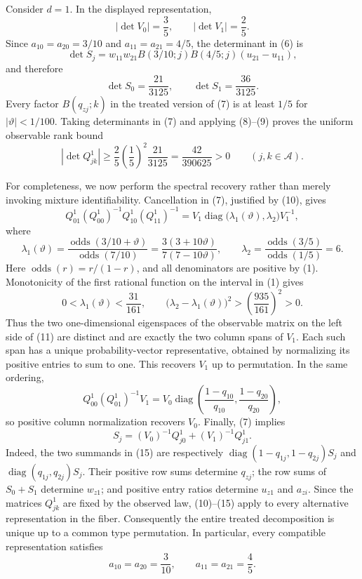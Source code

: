 Consider \(d=1\).  In the displayed representation,
\[
 |\det V_0|=\frac35,
 \qquad |\det V_1|=\frac25.
 \tag{8}
\]
Since \(a_{10}=a_{20}=3/10\) and \(a_{11}=a_{21}=4/5\), the determinant in (6) is
\[
 \det S_j=w_{11}w_{21}B(3/10;j)B(4/5;j)(u_{21}-u_{11}),
\]
and therefore
\[
 \det S_0=\frac{21}{3125},
 \qquad \det S_1=\frac{36}{3125}.
 \tag{9}
\]
Every factor \(B(q_{zj};k)\) in the treated version of (7) is at least \(1/5\) for \(|\vartheta|<1/100\).  Taking determinants in (7) and applying (8)--(9) proves the uniform observable rank bound
\[
 |\det Q_{jk}^{1}|
 \ge \frac25\left(\frac15\right)^2\frac{21}{3125}
 =\frac{42}{390625}>0
 \qquad(j,k\in\mathcal A).
 \tag{10}
\]

For completeness, we now perform the spectral recovery rather than merely invoking mixture identifiability.  Cancellation in (7), justified by (10), gives
\[
 Q_{01}^{1}(Q_{00}^{1})^{-1}Q_{10}^{1}(Q_{11}^{1})^{-1}
 =V_1\operatorname{diag}\bigl(\lambda_1(\vartheta),\lambda_2\bigr)V_1^{-1},
 \tag{11}
\]
where
\[
 \lambda_1(\vartheta)
 =\frac{\operatorname{odds}(3/10+\vartheta)}{\operatorname{odds}(7/10)}
 =\frac{3(3+10\vartheta)}{7(7-10\vartheta)},
 \qquad
 \lambda_2
 =\frac{\operatorname{odds}(3/5)}{\operatorname{odds}(1/5)}=6.
 \tag{12}
\]
Here \(\operatorname{odds}(r)=r/(1-r)\), and all denominators are positive by (1).  Monotonicity of the first rational function on the interval in (1) gives
\[
 0<\lambda_1(\vartheta)<\frac{31}{161},
 \qquad
 \bigl(\lambda_2-\lambda_1(\vartheta)\bigr)^2
 >\left(\frac{935}{161}\right)^2>0.
 \tag{13}
\]
Thus the two one-dimensional eigenspaces of the observable matrix on the left side of (11) are distinct and are exactly the two column spans of \(V_1\).  Each such span has a unique probability-vector representative, obtained by normalizing its positive entries to sum to one.  This recovers \(V_1\) up to permutation.  In the same ordering,
\[
 Q_{00}^{1}(Q_{01}^{1})^{-1}V_1
 =V_0\operatorname{diag}\left(\frac{1-q_{10}}{q_{10}},
                                  \frac{1-q_{20}}{q_{20}}\right),
 \tag{14}
\]
so positive column normalization recovers \(V_0\).  Finally, (7) implies
\[
 S_j=(V_0)^{-1}Q_{j0}^{1}+(V_1)^{-1}Q_{j1}^{1}.
 \tag{15}
\]
Indeed, the two summands in (15) are respectively
\(\operatorname{diag}(1-q_{1j},1-q_{2j})S_j\) and
\(\operatorname{diag}(q_{1j},q_{2j})S_j\).  Their positive row sums determine \(q_{zj}\); the row sums of \(S_0+S_1\) determine \(w_{z1}\); and positive entry ratios determine \(u_{z1}\) and \(a_{zi}\).  Since the matrices \(Q_{jk}^{1}\) are fixed by the observed law, (10)--(15) apply to every alternative representation in the fiber.  Consequently the entire treated decomposition is unique up to a common type permutation.  In particular, every compatible representation satisfies
\[
 a_{10}=a_{20}=\frac3{10},
 \qquad a_{11}=a_{21}=\frac45.
 \tag{16}
\]

